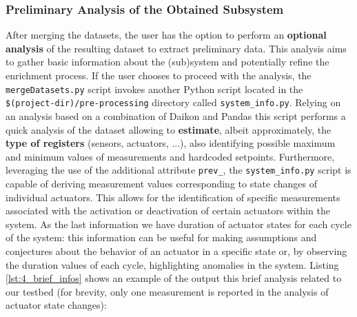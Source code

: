 \subsubsection{Preliminary Analysis of the Obtained Subsystem}
\label{subsubsec:4_brief_analysis}

After merging the datasets, the user has the option to perform an \textbf{optional analysis} of the resulting dataset to extract preliminary data. This analysis aims to gather basic information about the (sub)system and potentially refine the enrichment process. If the user chooses to proceed with the analysis, the \texttt{mergeDatasets.py} script invokes another Python script located in the \texttt{\$(project-dir)/pre-processing} directory called \texttt{system\_info.py}.\newline
Relying on an analysis based on a combination of Daikon and Pandas this script performs a quick analysis of the dataset allowing to \textbf{estimate}, albeit approximately, the \textbf{type of registers} (sensors, actuators, ...), also identifying possible maximum and minimum values of measurements and hardcoded setpoints. Furthermore, leveraging the use of the additional attribute \texttt{prev\_}, the \texttt{system\_info.py} script is capable of deriving measurement values corresponding to state changes of individual actuators. This allows for the identification of specific measurements associated with the activation or deactivation of certain actuators within the system.\newline
As the last information we have duration of actuator states for each cycle of the system: this information can be useful for making assumptions and conjectures about the behavior of an actuator in a specific state or, by observing the duration values of each cycle, highlighting anomalies in the system. \newline \newline
Listing \ref{lst:4_brief_infos} shows an example of the output this brief analysis related to our testbed (for brevity, only one measurement is reported in the analysis of actuator state changes):

